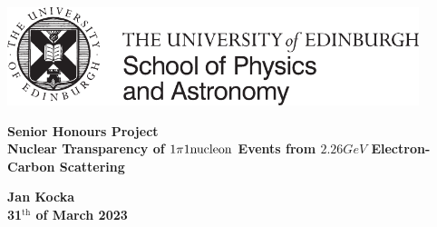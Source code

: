 \documentclass[a4paper,12pt]{article}
\newcommand{\efn}{e4$\nu$}
\newcommand{\CC}{C\texttt{++}}
\begin{document}
\pagestyle{empty}
\par\noindent\includegraphics[width=12cm]{PandA_crest.pdf}
\par\noindent

\vspace{0.5cm}

\begin{center}
        \Large\bf \Large\bf Senior Honours Project \\
        \vspace{0.2cm}
        \LARGE\bf Nuclear Transparency of $1\pi1\text{\normalfont nucleon}$ Events from $2.26\si{GeV}$ Electron-Carbon Scattering
\end{center}

\vspace{0.2cm}

\begin{center}
        \bf Jan Kocka \\
        31$^\text{th}$ of March 2023
\end{center}

\vspace{0.2cm}

\begin{abstract}
    \noindent
    We outline the need for a better understanding of neutrino-nucleus interactions and how studying electron-nucleus interaction can be used for the purpose.
    It covers some of the prerequisites to understand such studies, including the most commonly studied interaction types and the use of Monte Carlo event generators like GENIE.
    An introduction to the CLAS6 data used by the \efn\ collaboration is presented and a new codebase using modern \CC\ to analyse the data was developed.
    Finally we use this code to conduct a study of nuclear effects on the reconstruction of pion momentum of 1 pion 1 nucleon events (mainly from $\Delta_{1232}$ resonances) from GENIE generated 2.26\si{GeV} incident electron - carbon nucleus scattering.
    We identify errors of the reconstruction due to initial state effects and final state interactions, and show that even when accounting for detector precision such reconstruction may be possible to within a 400 \si{Mev/c} bin.
\end{abstract}
\end{document}
